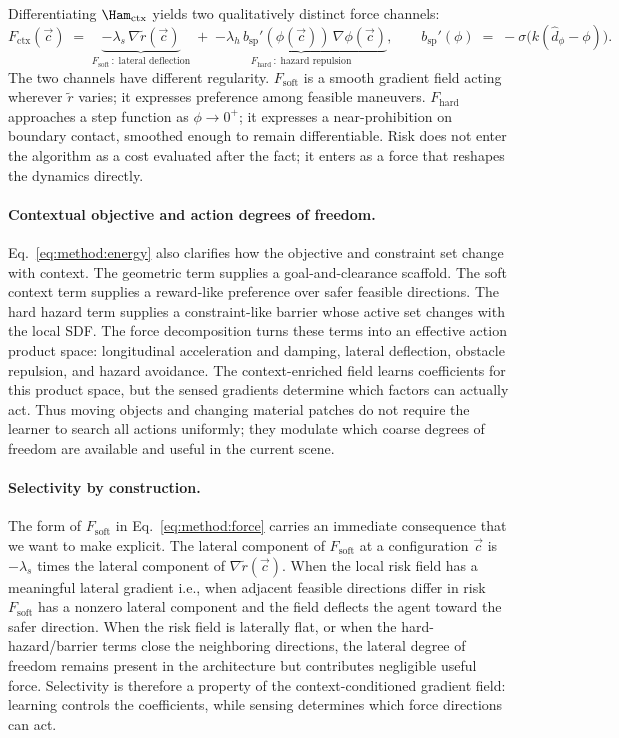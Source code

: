 Differentiating $\Ham_{\mathrm{ctx}}$ yields two qualitatively distinct
force channels:
\begin{equation}
F_{\mathrm{ctx}}(\vec c)
\;=\;
\underbrace{-\lambda_s\,\nabla \tilde r(\vec c)}_{F_{\mathrm{soft}}\,:\;\text{lateral deflection}}
\;+\;
\underbrace{-\lambda_h\, b_{\mathrm{sp}}'(\phi(\vec c))\,\nabla\phi(\vec c)}_{F_{\mathrm{hard}}\,:\;\text{hazard repulsion}},
\qquad
b_{\mathrm{sp}}'(\phi) \;=\; -\sigma\!\bigl(k(\hat d_\phi - \phi)\bigr).
\label{eq:method:force}
\end{equation}
The two channels have different regularity. $F_{\mathrm{soft}}$ is a
smooth gradient field acting wherever $\tilde r$ varies; it expresses
preference among feasible maneuvers. $F_{\mathrm{hard}}$ approaches a
step function as $\phi \to 0^+$; it expresses a near-prohibition on
boundary contact, smoothed enough to remain differentiable. Risk does
not enter the algorithm as a cost evaluated after the fact; it enters
as a force that reshapes the dynamics directly.

\paragraph{Contextual objective and action degrees of freedom.}
Eq.~\eqref{eq:method:energy} also clarifies how the objective and
constraint set change with context. The geometric term supplies a
goal-and-clearance scaffold. The soft context term supplies a
reward-like preference over safer feasible directions. The hard hazard
term supplies a constraint-like barrier whose active set changes with
the local SDF. The force decomposition turns these terms into an
effective action product space: longitudinal acceleration and damping,
lateral deflection, obstacle repulsion, and hazard avoidance. The context-enriched field
learns coefficients for this product space, but the sensed gradients
determine which factors can actually act. Thus moving objects and
changing material patches do not require the learner to search all
actions uniformly; they modulate which coarse degrees of freedom are
available and useful in the current scene.

\paragraph{Selectivity by construction.}
The form of $F_{\mathrm{soft}}$ in Eq.~\eqref{eq:method:force} carries
an immediate consequence that we want to make explicit. The lateral
component of $F_{\mathrm{soft}}$ at a configuration $\vec c$ is
$-\lambda_s$ times the lateral component of $\nabla \tilde r(\vec c)$.
When the local risk field has a meaningful lateral gradient i.e.,
when adjacent feasible directions differ in risk $F_{\mathrm{soft}}$
has a nonzero lateral component and the field deflects the agent toward
the safer direction. When the risk field is laterally flat, or when the
hard-hazard/barrier terms close the neighboring directions, the lateral
degree of freedom remains present in the architecture but contributes
negligible useful force. Selectivity is therefore a property of the
context-conditioned gradient field: learning controls the coefficients,
while sensing determines which force directions can act.

